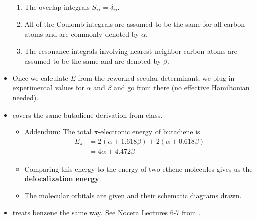 \documentclass[../notes.tex]{subfiles}
\begin{document}
\begin{itemize}
    \begin{enumerate}
        \item The overlap integrals $S_{ij}=\delta_{ij}$.
        \item All of the Coulomb integrals are assumed to be the same for all carbon atoms and are commonly denoted by $\alpha$.
        \item The resonance integrals involving nearest-neighbor carbon atoms are assumed to be the same and are denoted by $\beta$.
    \end{enumerate}
    \item Once we calculate $E$ from the reworked secular determinant, we plug in experimental values for $\alpha$ and $\beta$ and go from there (no effective Hamiltonian needed).
    \item \textcite{bib:McQuarrieSimon} covers the same butadiene derivation from class.
    \begin{itemize}
        \item Addendum: The total $\pi$-electronic energy of butadiene is
        \begin{align*}
            E_\pi &= 2(\alpha+1.618\beta)+2(\alpha+0.618\beta)\\
            &= 4\alpha+4.472\beta
        \end{align*}
        \item Comparing this energy to the energy of two ethene molecules gives us the \textbf{delocalization energy}.
        \item The molecular orbitals are given and their schematic diagrams drawn.
    \end{itemize}
    \item \textcite{bib:McQuarrieSimon} treats benzene the same way. See Nocera Lectures 6-7 from \textcite{bib:IChemNotes}.
\end{itemize}
\end{document}

